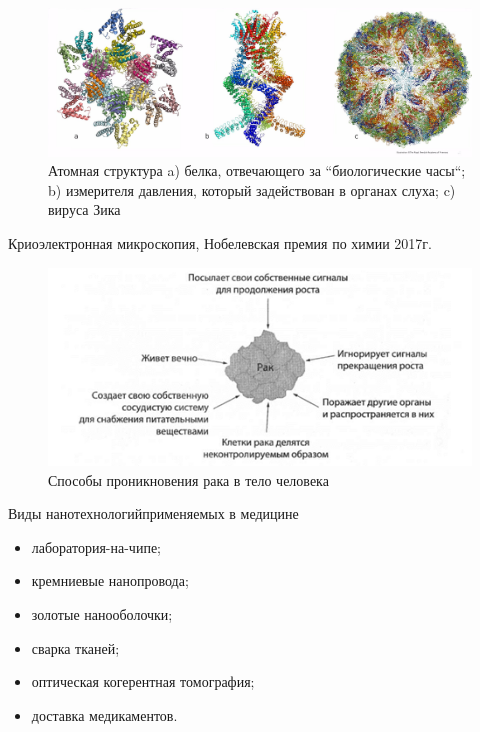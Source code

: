 \documentclass[_Venture_p3.tex]{subfiles}
\begin{document}
\begin{frame}
\begin{figure}
	\centering
	\includegraphics[scale=.2]{img/proteins_atomic_structures}
	\caption{Атомная структура a) белка, отвечающего за ``биологические часы``; b) измерителя давления, который задействован в органах слуха; c) вируса Зика }
\end{figure}
Криоэлектронная микроскопия, Нобелевская премия по химии 2017г.
\end{frame}


\begin{frame}
\begin{figure}
	\centering
	\includegraphics[scale=.95]{img/cancer_characteristics}
	\caption{Способы проникновения рака в тело человека}
\end{figure}
\end{frame}

\begin{frame}{Виды нанотехнологий}{применяемых в медицине}
\begin{itemize}
	\item лаборатория-на-чипе;
	\item кремниевые нанопровода;
	\item золотые нанооболочки;
	\item сварка тканей;
	\item оптическая когерентная томография;
	\item доставка медикаментов.
\end{itemize}
\end{frame}
\end{document}
